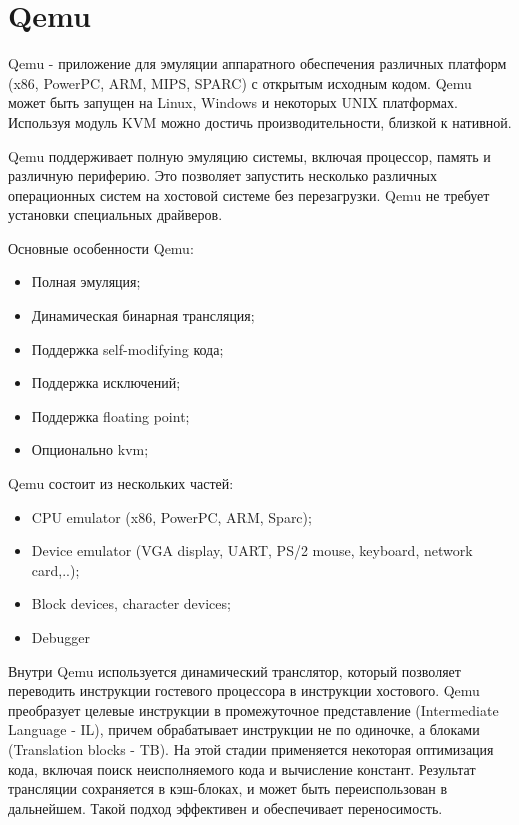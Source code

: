 \section{Qemu}
Qemu - приложение для эмуляции аппаратного обеспечения различных платформ (x86, PowerPC, ARM, MIPS, SPARC) с открытым исходным кодом. Qemu может быть запущен на Linux, Windows и некоторых UNIX платформах. Используя модуль KVM можно достичь производительности, близкой к нативной.

Qemu поддерживает полную эмуляцию системы, включая процессор, память и различную периферию. Это позволяет запустить несколько различных операционных систем на хостовой системе без перезагрузки. Qemu не требует установки специальных драйверов.

Основные особенности Qemu:
\begin{itemize}
    \item Полная эмуляция;
    \item Динамическая бинарная трансляция;
    \item Поддержка self-modifying кода;
    \item Поддержка исключений;
    \item Поддержка floating point;
    \item Опционально kvm;
\end{itemize}



Qemu состоит из нескольких частей:
\begin{itemize}
    \item CPU emulator (x86, PowerPC, ARM, Sparc);
    \item Device emulator (VGA display, UART, PS/2 mouse, keyboard, network card,..);
    \item Block devices, character devices;
    \item Debugger
\end{itemize}

Внутри Qemu используется динамический транслятор, который позволяет переводить инструкции гостевого процессора в инструкции хостового. Qemu преобразует целевые инструкции в промежуточное представление (Intermediate Language - IL), причем обрабатывает инструкции не по одиночке, а блоками (Translation blocks - TB). На этой стадии применяется некоторая оптимизация кода, включая поиск неисполняемого кода и вычисление констант. Результат трансляции сохраняется в кэш-блоках, и может быть переиспользован в дальнейшем. Такой подход эффективен и обеспечивает переносимость.


